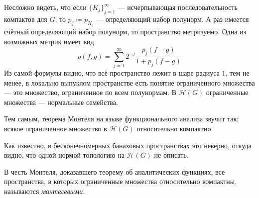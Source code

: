 \documentclass[a4paper]{report}
\begin{document}
    Несложно видеть, что если $\{K_j\}_{j = 1}^{\infty}$ --- исчерпывающая последовательность компактов для $G$, то $p_j \coloneqq p_{K_j}$ --- определяющий набор полунорм.
    А раз имеется счётный определяющий набор полунорм, то пространство метризуемо.
    Одна из возможных метрик имеет вид \[\rho(f, g) = \sum\limits_{j = 1}^{\infty}2^{-j}\frac{p_j(f - g)}{1 + p_j(f - g)}\]
    Из самой формулы видно, что всё пространство лежит в шаре радиуса $1$, тем не менее, в локально выпуклом пространстве есть понятие ограниченного множества --- это множество, ограниченное по всем полунормам.
    В $\mathcal{H}(G)$ ограниченные множества --- нормальные семейства.

    Тем самым, теорема Монтеля на языке функционального анализа звучит так: всякое ограниченное множество в $\mathcal{H}(G)$ относительно компактно.

    Как известно, в бесконечномерных банаховых пространствах это неверно, откуда видно, что одной нормой топологию на $\mathcal{H}(G)$ не описать.

    В честь Монтеля, доказавшего теорему об аналитических функциях, все пространства, в которых ограниченные множества относительно компактны, называются \emph{монтелевыми}.
\end{document}
